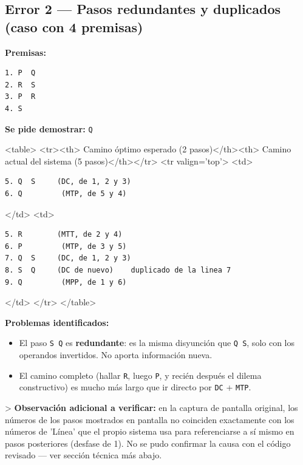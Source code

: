 \documentclass[11pt,a4paper,openany]{book}
\begin{document}
\hrulefill

\subsection{Error 2 --- Pasos redundantes y duplicados (caso con 4 premisas)}

\textbf{Premisas:}

\begin{lstlisting}[language={},basicstyle=\ttfamily\scriptsize]
1. P  Q
2. R  S
3. P  R
4. S
\end{lstlisting}

\textbf{Se pide demostrar:} \texttt{Q}

<table>
<tr><th> Camino óptimo esperado (2 pasos)</th><th> Camino actual del sistema (5 pasos)</th></tr>
<tr valign='top'>
<td>

\begin{lstlisting}[language={},basicstyle=\ttfamily\scriptsize]
5. Q  S     (DC, de 1, 2 y 3)
6. Q         (MTP, de 5 y 4)
\end{lstlisting}

</td>
<td>

\begin{lstlisting}[language={},basicstyle=\ttfamily\scriptsize]
5. R        (MTT, de 2 y 4)
6. P         (MTP, de 3 y 5)
7. Q  S     (DC, de 1, 2 y 3)
8. S  Q     (DC de nuevo)    duplicado de la linea 7
9. Q         (MPP, de 1 y 6)
\end{lstlisting}

</td>
</tr>
</table>

\textbf{Problemas identificados:}
\begin{itemize}[leftmargin=*]
\item El paso \texttt{S  Q} es \textbf{redundante}: es la misma disyunción que \texttt{Q  S}, solo con los operandos invertidos. No aporta información nueva.
\item El camino completo (hallar \texttt{R}, luego \texttt{P}, y recién después el dilema constructivo) es mucho más largo que ir directo por \texttt{DC} + \texttt{MTP}.
\end{itemize}

> \textbf{Observación adicional a verificar:} en la captura de pantalla original, los números de los pasos mostrados en pantalla no coinciden exactamente con los números de 'Línea' que el propio sistema usa para referenciarse a sí mismo en pasos posteriores (desfase de 1). No se pudo confirmar la causa con el código revisado --- ver sección técnica más abajo.
\end{document}

